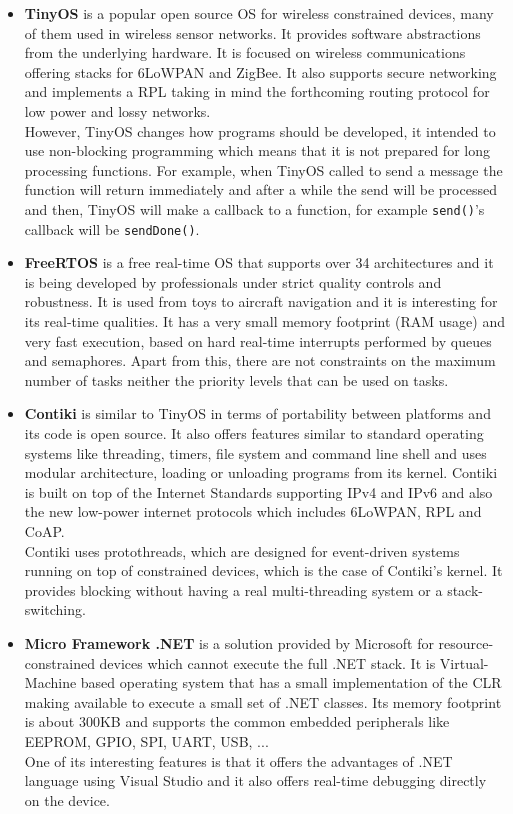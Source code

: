 \begin{itemize}
\item \textbf{TinyOS} is a popular open source OS for wireless constrained devices, many of them used in wireless sensor networks. It provides software abstractions from the underlying hardware. It is focused on wireless communications offering stacks for 6LoWPAN and ZigBee. It also supports secure networking and implements a \gls{RPL} taking in mind the forthcoming routing protocol for low power and lossy networks.
\\
However, TinyOS changes how programs should be developed, it intended to use non-blocking programming which means that it is not prepared for long processing functions. For example, when TinyOS called to send a message the function will return immediately and after a while the send will be processed and then, TinyOS will make a callback to a function, for example \verb!send()!'s callback will be \verb!sendDone()!.

\item \textbf{FreeRTOS} is a free real-time OS that supports over 34 architectures and it is being developed by professionals under strict quality controls and robustness. It is used from toys to aircraft navigation and it is interesting for its real-time qualities. It has a very small memory footprint (RAM usage) and very fast execution, based on hard real-time interrupts performed by queues and semaphores. Apart from this, there are not constraints on the maximum number of tasks neither the priority levels that can be used on tasks. 

\item \textbf{Contiki} is similar to TinyOS in terms of portability between platforms and its code is open source. It also offers features similar to standard operating systems like threading, timers, file system and command line shell and uses modular architecture, loading or unloading programs from its kernel. Contiki is built on top of the Internet Standards supporting IPv4 and IPv6 and also the new low-power internet protocols which includes 6LoWPAN, RPL and CoAP.
\\
Contiki uses protothreads, which are designed for event-driven systems running on top of constrained devices, which is the case of Contiki's kernel. It provides blocking without having a real multi-threading system or a stack-switching.

\item \textbf{Micro Framework .NET} is a solution provided by Microsoft for resource-constrained devices which cannot execute the full .NET stack. It is Virtual-Machine based operating system that has a small implementation of the CLR making available to execute a small set of .NET classes. Its memory footprint is about 300KB and supports the common embedded peripherals like EEPROM, GPIO, SPI, UART, USB, ...
\\
One of its interesting features is that it offers the advantages of .NET language using Visual Studio and it also offers real-time debugging directly on the device.
\end{itemize}

